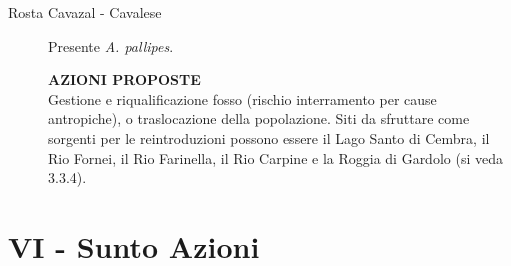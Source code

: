 \documentclass[11pt,a4paper,italian,twoside,openany]{memoir}
\begin{document}
\begin{description}
  \item[Rosta Cavazal - Cavalese] Presente \emph{A. pallipes}.

  \textbf{AZIONI PROPOSTE}\\

  Gestione e riqualificazione fosso (rischio interramento per cause antropiche), o traslocazione della popolazione.
  Siti da sfruttare come sorgenti per le reintroduzioni possono essere il Lago Santo di Cembra, il Rio Fornei, il Rio Farinella, il Rio Carpine e la Roggia di Gardolo (si veda 3.3.4).
\end{description}

\newpage
\section{VI - Sunto Azioni}
\end{document}
